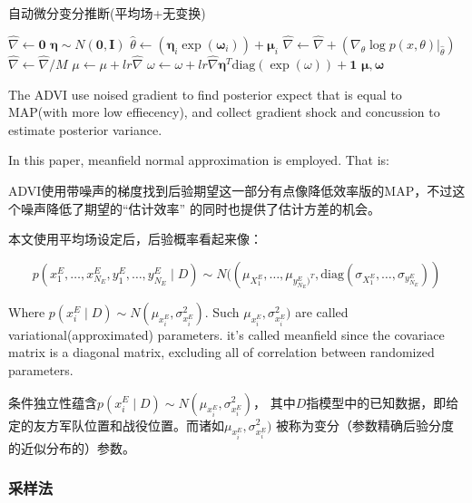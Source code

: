 \documentclass{article}
\begin{document}
\begin{algorithm}
\caption{自动微分变分推断(平均场+无变换)}
\begin{algorithmic}[1]
  
        \State $\hat{\nabla} \gets \mathbf{0}$
        \State $\mathbf{\eta} \sim N(\mathbf{0},\mathbf{I}) $ 
            \State $\hat{\theta} \gets (\mathbf{\eta}_i \exp(\mathbf{\omega}_i)) + \mathbf{\mu}_i$
            \State $\hat{\nabla} \gets \hat{\nabla} + (\nabla_\theta \log p(x,\theta)|_{\hat{\theta}})$
        \EndFor
        \State $\hat{\nabla} \gets \hat{\nabla} / M$
        \State $\mu \gets \mu + lr \hat{\nabla}$
        \State $\omega \gets \omega + lr \hat{\nabla} \mathbf{\eta}^T \mathrm{diag}({\exp(\omega)}) + \mathbf{1}$
    \EndFor 
    \State \Return $\mathbf{\mu},\mathbf{\omega}$
\EndProcedure
\end{algorithmic}
\label{alg:advi}
\end{algorithm}

The ADVI use noised gradient to find posterior expect that is equal to MAP(with more low effiecency),
 and collect gradient shock and concussion to estimate posterior variance.
 
In this paper, meanfield normal approximation is employed. That is:

ADVI使用带噪声的梯度找到后验期望这一部分有点像降低效率版的MAP，不过这个噪声降低了期望的“估计效率”
的同时也提供了估计方差的机会。

本文使用平均场设定后，后验概率看起来像：

$$
p(x^E_1,\dots,x^E_{N_E},y^E_1,\dots,y^E_{N_E} \mid D) \sim 
N((\mu_{X^E_1},\dots,\mu_{y^E_{N_E})^T},\mathrm{diag}(\sigma_{X^E_1},\dots,\sigma_{y^E_{N_E}}))
$$

Where $p(x^E_i \mid D) \sim N(\mu_{x^E_i},\sigma_{x^E_i}^2)$. 
Such $\mu_{x^E_i},\sigma_{x^E_i}^2)$ are called variational(approximated) parameters. 
it's called meanfield since the covariace matrix is a diagonal matrix, 
excluding all of correlation between randomized parameters.

条件独立性蕴含$p(x^E_i \mid D) \sim N(\mu_{x^E_i},\sigma_{x^E_i}^2)$，
其中$D$指模型中的已知数据，即给定的友方军队位置和战役位置。而诸如$\mu_{x^E_i},\sigma_{x^E_i}^2)$
被称为变分（参数精确后验分度的近似分布的）参数。

\subsubsection{采样法}
\end{document}
